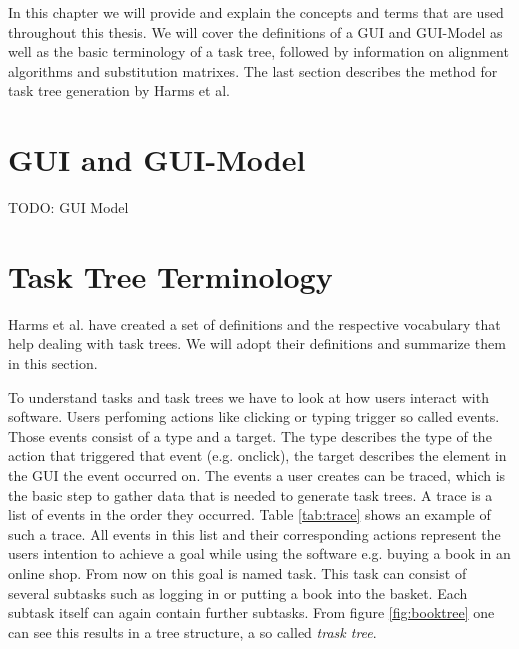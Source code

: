 In this chapter we will provide and explain the concepts and terms that are used throughout this thesis. 
We will cover the definitions of a GUI and GUI-Model as well as the basic terminology of a task tree, followed by 
 information on alignment algorithms and substitution matrixes.
The last section describes the method for task tree generation by Harms et al.\cite{harms2013}


\section{GUI and GUI-Model}
\label{sec:foundationguiandguimodel}

TODO: GUI Model

\section{Task Tree Terminology}
\label{sec:foundationtasktreeterminology}
Harms et al.\cite{harms2013} have created a set of definitions and the respective vocabulary that help dealing with task trees.
We will adopt their definitions and summarize them in this section.

To understand tasks and task trees we have to look at how users interact with software. 
Users perfoming actions like clicking or typing trigger so called events. 
Those events consist of a type and a target. 
The type describes the type of the action that triggered that event (e.g. onclick), the target describes the element in the GUI the event occurred on.
The events a user creates can be traced, which is the basic step to gather data that is needed to generate task trees. 
A trace is a list of events in the order they occurred. Table \ref{tab:trace} shows an example of such a trace. 
All events in this list and their corresponding actions represent the users intention to achieve a goal while using the software e.g. buying a book 
in an online shop. From now on this goal is named task. This task can consist of several subtasks such as logging in or putting a book into the basket.
Each subtask itself can again contain further subtasks. From figure \ref{fig:booktree} one can see this results in a tree structure, a so called \textit{trask tree}.

